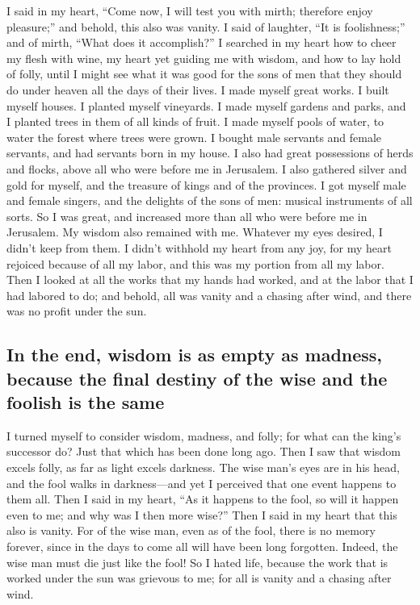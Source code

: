  I said in my heart, ``Come now, I will test you with
mirth; therefore enjoy pleasure;'' and behold, this also was vanity.
 I said of laughter, ``It is foolishness;'' and of mirth,
``What does it accomplish?''  I searched in my heart how
to cheer my flesh with wine, my heart yet guiding me with wisdom, and
how to lay hold of folly, until I might see what it was good for the
sons of men that they should do under heaven all the days of their
lives.  I made myself great works. I built myself houses.
I planted myself vineyards.  I made myself gardens and
parks, and I planted trees in them of all kinds of fruit. 
I made myself pools of water, to water the forest where trees were
grown.  I bought male servants and female servants, and
had servants born in my house. I also had great possessions of herds and
flocks, above all who were before me in Jerusalem.  I also
gathered silver and gold for myself, and the treasure of kings and of
the provinces. I got myself male and female singers, and the delights of
the sons of men: musical instruments of all sorts.  So I
was great, and increased more than all who were before me in Jerusalem.
My wisdom also remained with me.  Whatever my eyes
desired, I didn't keep from them. I didn't withhold my heart from any
joy, for my heart rejoiced because of all my labor, and this was my
portion from all my labor.  Then I looked at all the
works that my hands had worked, and at the labor that I had labored to
do; and behold, all was vanity and a chasing after wind, and there was
no profit under the sun.

\hypertarget{in-the-end-wisdom-is-as-empty-as-madness-because-the-final-destiny-of-the-wise-and-the-foolish-is-the-same}{%
\subsection{In the end, wisdom is as empty as madness, because the final
destiny of the wise and the foolish is the
same}\label{in-the-end-wisdom-is-as-empty-as-madness-because-the-final-destiny-of-the-wise-and-the-foolish-is-the-same}}

 I turned myself to consider wisdom, madness, and folly;
for what can the king's successor do? Just that which has been done long
ago.  Then I saw that wisdom excels folly, as far as
light excels darkness.  The wise man's eyes are in his
head, and the fool walks in darkness---and yet I perceived that one
event happens to them all.  Then I said in my heart, ``As
it happens to the fool, so will it happen even to me; and why was I then
more wise?'' Then I said in my heart that this also is vanity.
 For of the wise man, even as of the fool, there is no
memory forever, since in the days to come all will have been long
forgotten. Indeed, the wise man must die just like the fool!
 So I hated life, because the work that is worked under
the sun was grievous to me; for all is vanity and a chasing after wind.

